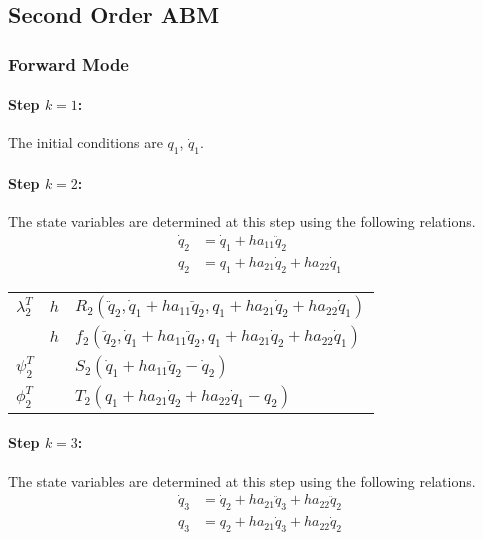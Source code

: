\documentclass[10pt,letter]{book}
\begin{document}
     \subsection{Second Order ABM}

     \subsubsection{Forward Mode}
     
     \paragraph{Step $k=1$:}
     The initial conditions are $q_1$, $\dot{q}_1$.
     
     \paragraph{Step $k=2$:}
     The state variables are determined at this step using the
     following relations.
     \begin{equation}\nonumber
       \begin{split}
         \dot{q}_{2} &= \dot{q}_1 + h a_{11} \ddot{q}_{2}  \\
         q_{2}       &= q_1 + h a_{21} \dot{q}_{2} + ha_{22} \dot{q}_{1}
       \end{split}
     \end{equation}

     \begin{table}[H]
       \centering
       \begin{tabular}{l | l  |l}
         $\lambda_{2}^T$ & $h$ & $R_2(\ddot{q}_2, \dot{q}_1 + h a_{11} \ddot{q}_{2},  q_1 + h a_{21} \dot{q}_{2} + h a_{22} \dot{q}_1)$\\
         & $h$ & $f_2(\ddot{q}_2, \dot{q}_1 + h a_{11} \ddot{q}_{2},  q_1 + h a_{21} \dot{q}_{2} + h a_{22} \dot{q}_1 )$\\
         $\psi_2^T$ & & $S_2\left(\dot{q}_1 + h a_{11} \ddot{q}_{2} - \dot{q}_{2} \right)$ \\
         $\phi_2^T$ & & $T_2\left(q_1 + h a_{21} \dot{q}_{2} + h a_{22} \dot{q}_1 - q_{2}\right) $ \\
       \end{tabular}
     \end{table}

     \paragraph{Step $k=3$:}
     The state variables are determined at this step using the
     following relations.
     \begin{equation}\nonumber
       \begin{split}
         \dot{q}_{3} &= \dot{q}_2 + h a_{21} \ddot{q}_{3} + h a_{22} \ddot{q}_{2} \\
         q_{3}       &=      q_2  + h a_{21} \dot{q}_{3}  + h a_{22} \dot{q}_{2}
       \end{split}
     \end{equation}
\end{document}
